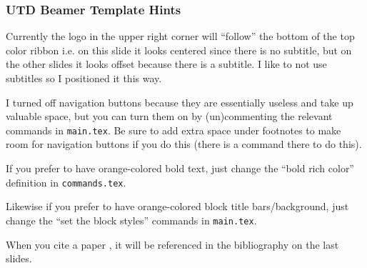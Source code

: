 \begin{frame}
\frametitle{UTD Beamer Template Hints}
Currently the logo in the upper right corner will ``follow'' the bottom of the top color ribbon i.e. on this slide it looks centered since there is no subtitle, but on the other slides it looks offset because there is a subtitle. I like to not use subtitles so I positioned it this way.

I turned off navigation buttons because they are essentially useless and take up valuable space, but you can turn them on by (un)commenting the relevant commands in \texttt{main.tex}. Be sure to add extra space under footnotes to make room for navigation buttons if you do this (there is a command there to do this).

If you prefer to have orange-colored bold text, just change the ``bold rich color'' definition in \texttt{commands.tex}.

Likewise if you prefer to have orange-colored block title bars/background, just change the ``set the block styles'' commands in \texttt{main.tex}.

When you cite a paper \cite{kalman1960contributions}, it will be referenced in the bibliography on the last slides.
\end{frame}



